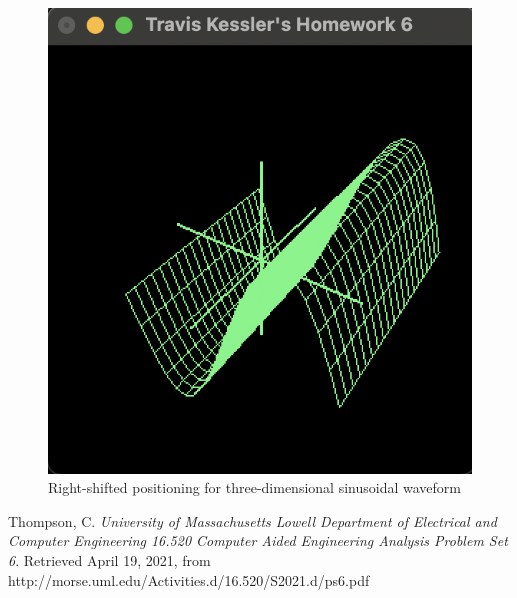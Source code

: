 \documentclass{report}
\begin{document}
	\begin{figure}[!ht]
		\centering
		\includegraphics[scale=0.7, trim={0 0.05cm 0 0.0cm}, clip]{figures/3d_r.png}
		\caption{Right-shifted positioning for three-dimensional sinusoidal waveform}
	\end{figure}

\newpage

	\begin{thebibliography}{99\kern\bibindent}
	
	Thompson, C.
	\textit{University of Massachusetts Lowell Department of Electrical and Computer Engineering 16.520 Computer Aided Engineering Analysis Problem Set 6}.
	Retrieved April 19, 2021, from http://morse.uml.edu/Activities.d/16.520/S2021.d/ps6.pdf
	
	\end{thebibliography}
\end{document}
